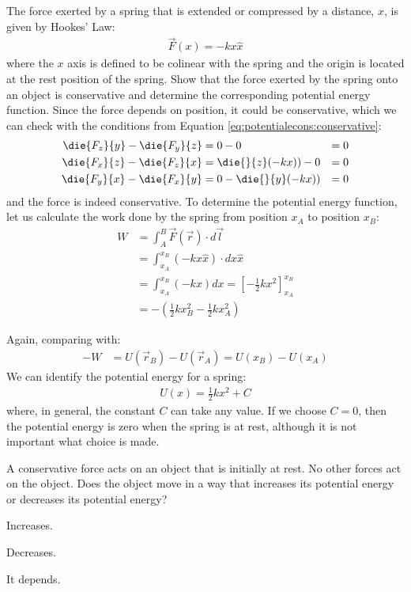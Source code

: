 \newpage
\begin{example}{\label{ex:potentialecons:springpotential}The force exerted by a spring that is extended or compressed by a distance, $x$, is given by Hookes' Law:
\begin{align*}
\vec F(x) = -k x\hat x
\end{align*}
where the $x$ axis is defined to be colinear with the spring and the origin is located at the rest position of the spring. Show that the force exerted by the spring onto an object is conservative
and determine the corresponding potential energy function.} Since the force depends on position, it could be conservative, which we can check with the conditions from Equation \ref{eq:potentialecons:conservative}:
\begin{align*}
\die{F_z}{y}-\die{F_y}{z} &= 0 - 0 &= 0\\
\die{F_x}{z}-\die{F_z}{x} &= \die{}{z}(-kx)) - 0&= 0\\
\die{F_y}{x}-\die{F_x}{y} &= 0 - \die{}{y}(-kx)) &=0
\end{align*}
and the force is indeed conservative. To determine the potential energy function, let us calculate the work done by the spring from position $x_A$ to position $x_B$:
\begin{align*}
W &=\int_A^B \vec F(\vec r) \cdot d\vec l\\
&=\int_{x_A}^{x_B} (-kx\hat x) \cdot dx \hat x\\
&=\int_{x_A}^{x_B} (-kx)dx=\left[-\frac{1}{2}kx^2  \right]_{x_A}^{x_B}\\
&=-\left( \frac{1}{2}kx_B^2-\frac{1}{2}kx_A^2 \right)
\end{align*}

Again, comparing with:
\begin{align*}
-W &= U(\vec r_B) - U(\vec r_A) = U(x_B) - U(x_A)
\end{align*}
We can identify the potential energy for a spring:
\begin{align*}
U(x) = \frac{1}{2}kx^2 + C
\end{align*}
where, in general, the constant $C$ can take any value. If we choose $C=0$, then the potential energy is zero when the spring is at rest, although it is not important what choice is made.
\end{example}

\begin{checkpoint}
\begin{MCquestion}{A conservative force acts on an object that is initially at rest. No other forces act on the object. Does the object move in a way that increases its potential energy or decreases its potential energy?}
\item Increases.
\item Decreases. \correct
\item It depends.
\end{MCquestion}
\end{checkpoint}

